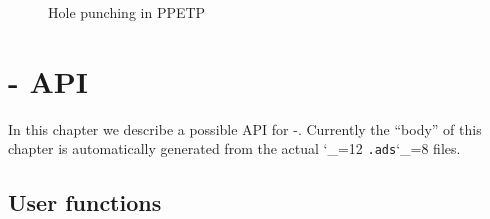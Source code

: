 \documentclass{rfc}
\def\ttt{\catcode`\_=12 \tttii}
\def\tttii#1!{{\tt #1}\catcode`\_=8{}}
\begin{document}
\begin{figure}
\centerline{}
\caption{Hole punching in PPETP
\label{fig:nat-trav}}
\end{figure}
%

\appendix

\chapter{\ppetp- API}
\label{sect:1;driver}

In this chapter we describe a possible API for \ppetp-.  Currently the
``body'' of this chapter is automatically generated from the actual
\ttt .ads! files.  

\section{User functions}
\label{sect:1.1;driver}







\end{document}

